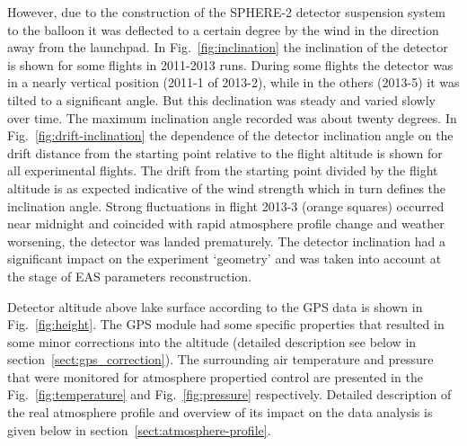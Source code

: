 \documentclass[final,5p,times,twocolumn]{elsarticle}
\begin{document}
However, due to the construction of the SPHERE-2 detector suspension system to the balloon it was deflected to a certain degree by the wind in the direction away from the launchpad. In Fig.~\ref{fig:inclination} the inclination of the detector is shown for some flights in 2011-2013 runs. During some flights the detector was in a nearly vertical position (2011-1 of 2013-2), while in the others (2013-5) it was tilted to a significant angle. But this declination was steady and varied slowly over time. The maximum inclination angle recorded was about twenty degrees. In Fig.~\ref{fig:drift-inclination} the dependence of the detector inclination angle on the drift distance from the starting point relative to the flight altitude is shown for all experimental flights. The drift from the starting point divided by the flight altitude is as expected indicative of the wind strength which in turn defines the inclination angle. Strong fluctuations in flight 2013-3 (orange squares) occurred near midnight and coincided with rapid atmosphere profile change and weather worsening, the detector was landed prematurely. The detector inclination had a significant impact on the experiment `geometry' and was taken into account at the stage of EAS parameters reconstruction.

Detector altitude above lake surface according to the GPS data is shown in Fig.~\ref{fig:height}. The GPS module had some specific properties that resulted in some minor corrections into the altitude (detailed description see below in section~\ref{sect:gps_correction}). The surrounding air temperature and pressure  that were monitored for atmosphere propertied control are presented in the Fig.~\ref{fig:temperature} and Fig.~\ref{fig:pressure} respectively. Detailed description of the real atmosphere profile and overview of its impact on the data analysis is given below in section~\ref{sect:atmosphere-profile}.
\end{document}
